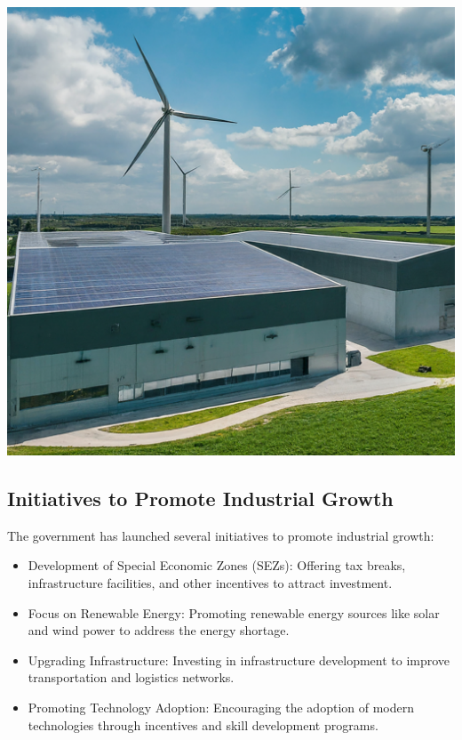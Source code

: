 \documentclass[
  letterpaper,
  DIV=11,
  numbers=noendperiod]{scrartcl}
\begin{document}
\includegraphics[width=6.66667in,height=\textheight]{images/industrial3.jpeg}

\subsection{Initiatives to Promote Industrial
Growth}\label{initiatives-to-promote-industrial-growth}

The government has launched several initiatives to promote industrial
growth:

\begin{itemize}
\item
  Development of Special Economic Zones (SEZs): Offering tax breaks,
  infrastructure facilities, and other incentives to attract investment.
\item
  Focus on Renewable Energy: Promoting renewable energy sources like
  solar and wind power to address the energy shortage.
\item
  Upgrading Infrastructure: Investing in infrastructure development to
  improve transportation and logistics networks.
\item
  Promoting Technology Adoption: Encouraging the adoption of modern
  technologies through incentives and skill development programs.
\end{itemize}
\end{document}
